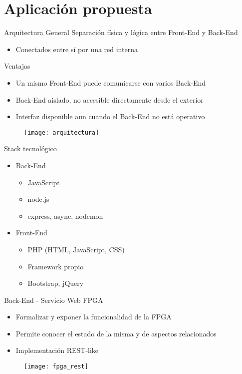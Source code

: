 \section{Aplicación propuesta}

\begin{frame}{Arquitectura General}
  Separación física y lógica entre Front-End y Back-End
  \begin{itemize}
    \item Conectados entre sí por una red interna
  \end{itemize}
  Ventajas
  \begin{itemize}
    \item Un mismo Front-End puede comunicarse con varios Back-End
    \item Back-End aislado, no accesible directamente desde el exterior
    \item Interfaz disponible aun cuando el Back-End no está operativo
  \end{itemize}
  \begin{figure}
    \texttt{[image: arquitectura]}
  \end{figure}
\end{frame}

\begin{frame}{Stack tecnológico}
  \begin{itemize}
    \item Back-End
    \begin{itemize}
      \item JavaScript
      \item node.js
      \item express, async, nodemon
    \end{itemize}
    \item Front-End
    \begin{itemize}
      \item PHP (HTML, JavaScript, CSS)
      \item Framework propio
      \item Bootstrap, jQuery
    \end{itemize}
  \end{itemize}
\end{frame}

\begin{frame}{Back-End - Servicio Web FPGA}
  \begin{itemize}
    \item Formalizar y exponer la funcionalidad de la FPGA
    \item Permite conocer el estado de la misma y de aspectos relacionados
    \item Implementación REST-like
  \end{itemize}
  \begin{figure}
    \texttt{[image: fpga\_rest]}
  \end{figure}
\end{frame}

